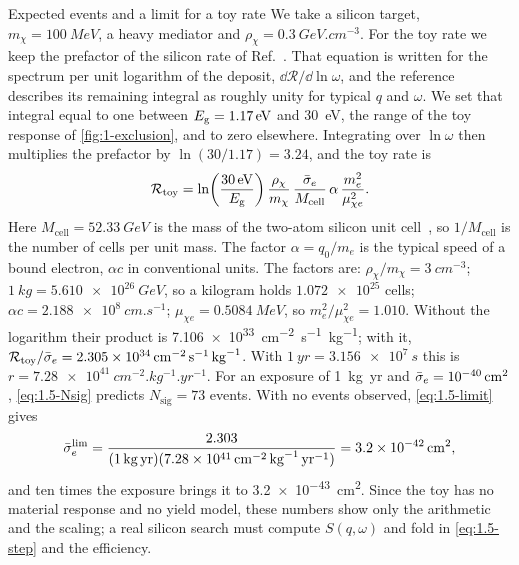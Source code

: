 \begin{workedexample}{Expected events and a limit for a toy rate}\label{we:1-limit}
We take a silicon target, $m_\chi = \SI{100}{MeV}$, a heavy mediator and $\rho_\chi = \SI{0.3}{GeV.cm^{-3}}$. For the toy rate we keep the prefactor of the silicon rate of Ref.~\cite[Eq.~(3.13)]{essig2016direct}. That equation is written for the spectrum per unit logarithm of the deposit, $\dd\mathcal{R}/\dd\ln\omega$, and the reference describes its remaining integral as roughly unity for typical $q$ and $\omega$. We set that integral equal to one between $E_{\mathrm{g}} = \SI{1.17}{eV}$ and \SI{30}{eV}, the range of the toy response of \cref{fig:1-exclusion}, and to zero elsewhere. Integrating over $\ln\omega$ then multiplies the prefactor by $\ln(30/1.17) = 3.24$, and the toy rate is
\begin{equation*}
  \mathcal{R}_{\mathrm{toy}} = \ln\!\left(\frac{\SI{30}{eV}}{E_{\mathrm{g}}}\right)\frac{\rho_\chi}{m_\chi}\,\frac{\bar{\sigma}_{e}}{M_{\mathrm{cell}}}\,\alpha\,\frac{m_e^2}{\mu_{\chi e}^2} .
\end{equation*}
Here $M_{\mathrm{cell}} = \SI{52.33}{GeV}$ is the mass of the two-atom silicon unit cell~\cite[below Eq.~(3.13)]{essig2016direct}, so $1/M_{\mathrm{cell}}$ is the number of cells per unit mass. The factor $\alpha = q_0/m_e$ is the typical speed of a bound electron, $\alpha c$ in conventional units. The factors are:
$\rho_\chi/m_\chi = \SI{3}{cm^{-3}}$;
$\SI{1}{kg} = \SI{5.610e26}{GeV}$, so a kilogram holds $\num{1.072e25}$ cells;
$\alpha c = \SI{2.188e8}{cm.s^{-1}}$;
$\mu_{\chi e} = \SI{0.5084}{MeV}$, so $m_e^2/\mu_{\chi e}^2 = 1.010$.
Without the logarithm their product is \SI{7.106e33}{cm^{-2}.s^{-1}.kg^{-1}}; with it, $\mathcal{R}_{\mathrm{toy}}/\bar{\sigma}_{e} = \SI{2.305e34}{cm^{-2}.s^{-1}.kg^{-1}}$. With $\SI{1}{yr} = \SI{3.156e7}{s}$ this is $r = \SI{7.28e41}{cm^{-2}.kg^{-1}.yr^{-1}}$.
For an exposure of \SI{1}{kg.yr} and $\bar{\sigma}_{e} = \SI{e-40}{cm^2}$, \cref{eq:1.5-Nsig} predicts $N_{\mathrm{sig}} = 73$ events. With no events observed, \cref{eq:1.5-limit} gives
\begin{equation*}
  \bar{\sigma}_{e}^{\mathrm{lim}} = \frac{2.303}{(\SI{1}{kg.yr})(\SI{7.28e41}{cm^{-2}.kg^{-1}.yr^{-1}})} = \SI{3.2e-42}{cm^2},
\end{equation*}
and ten times the exposure brings it to \SI{3.2e-43}{cm^2}. Since the toy has no material response and no yield model, these numbers show only the arithmetic and the scaling; a real silicon search must compute $S(q,\omega)$ and fold in \cref{eq:1.5-step} and the efficiency.
\end{workedexample}

